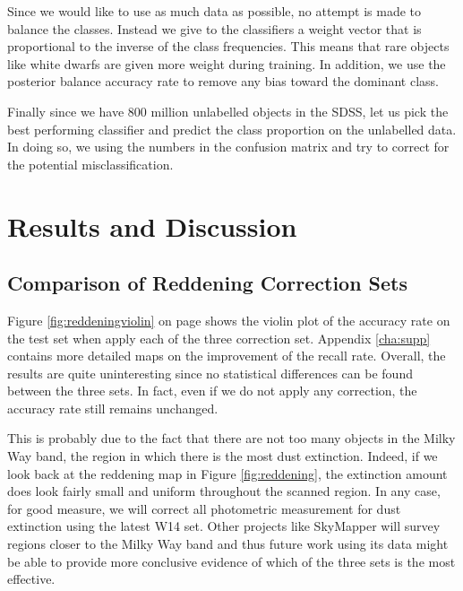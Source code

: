 Since we would like to use as much data as possible, no attempt is made to balance the classes.
Instead we give to the classifiers a weight vector that is proportional to the inverse
of the class frequencies. This means that rare objects like white dwarfs are given more
weight during training. In addition, we use the posterior balance accuracy rate to remove
any bias toward the dominant class.

Finally since we have 800 million unlabelled objects in the SDSS, let us pick the
best performing classifier and predict the class proportion on the unlabelled data.
In doing so, we using the numbers in the confusion matrix and try to correct for the
potential misclassification.

\section{Results and Discussion}
\label{sec:results1}

\subsection{Comparison of Reddening Correction Sets}
Figure \ref{fig:reddeningviolin} on page \pageref{fig:reddeningviolin} shows
the violin plot of the accuracy rate on the test
set when apply each of the three correction set. Appendix \ref{cha:supp} contains
more detailed maps on the improvement of the recall rate. Overall, the results are quite
uninteresting since no statistical differences can be found between the three sets. In fact,
even if we do not apply any correction, the accuracy rate still remains unchanged.

This is probably due to the fact that there are not too many objects in the Milky Way band,
the region in which there is the most dust extinction. Indeed, if we look back at the reddening map
in Figure \ref{fig:reddening}, the extinction amount does look fairly small and uniform
throughout the scanned region.
In any case, for good measure, we will correct all photometric measurement for dust
extinction using
the latest W14 set. Other projects like SkyMapper will survey regions closer to the Milky
Way band and thus future work using its data might be able to provide more conclusive
evidence of which of the three sets is the most effective.

